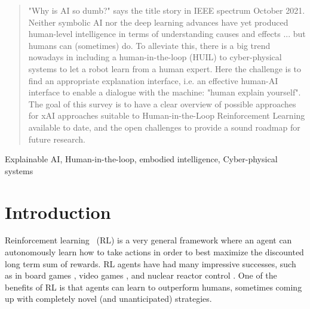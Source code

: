 \documentclass[twoside,11pt]{article}
\begin{document}
\newpage

\begin{abstract}%
"Why is AI so dumb?" says the title story in IEEE spectrum October 2021. Neither symbolic AI nor the deep learning advances have yet produced human-level intelligence in terms of understanding causes and effects ... but humans can (sometimes) do. To alleviate this, there is a big trend nowadays in including a human-in-the-loop (HUIL) to cyber-physical systems to let a robot learn from a human expert. Here the challenge is to find an appropriate explanation interface, i.e. an effective human-AI interface to enable a dialogue with the machine: "human explain yourself".  The goal of this survey is to have a clear overview of possible approaches for xAI approaches suitable to Human-in-the-Loop Reinforcement Learning available to date, and the open challenges to provide a sound roadmap for future research.
\end{abstract}


\begin{keywords}
Explainable AI, Human-in-the-loop, embodied intelligence, Cyber-physical systems
\end{keywords}


\section{Introduction}
\label{sec:introduction}

%

Reinforcement learning~\cite{SuttonBarto:2018:RLIntroduction} (RL) is a very general framework where an agent can autonomously learn how to take actions in order to best maximize the discounted long term sum of rewards. RL agents have had many impressive successes, such as in board games \cite{}, video games \cite{}, and nuclear reactor control \cite{}. One of the benefits of RL is that agents can learn to outperform humans, sometimes coming up with completely novel (and unanticipated) strategies.
\end{document}
